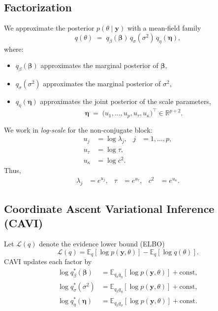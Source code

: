 \documentclass[11pt]{article}
\newcommand{\vect}[1]{\boldsymbol{#1}}
\newcommand{\E}{\mathbb{E}}
\newcommand{\R}{\mathbb{R}}
\begin{document}
\subsection{Factorization}

We approximate the posterior $p(\theta \mid \vect{y})$ with a mean-field family
\begin{equation}
  q(\theta)
  \;=\;
  q_{\beta}(\vect{\beta})\, q_{\sigma}(\sigma^2)\, q_{\eta}(\vect{\eta}),
\end{equation}
where:
\begin{itemize}
  \item $q_\beta(\vect{\beta})$ approximates the marginal posterior of $\vect{\beta}$,
  \item $q_\sigma(\sigma^2)$ approximates the marginal posterior of $\sigma^2$,
  \item $q_\eta(\vect{\eta})$ approximates the joint posterior of the scale parameters,
\[
  \vect{\eta} \;=\; 
  \big(u_1,\dots,u_p,u_\tau,u_\kappa\big)^\top \in \R^{p+2}.
\]
\end{itemize}

We work in \emph{log-scale} for the non-conjugate block:
\begin{align}
  u_j &= \log \lambda_j,      & j &= 1,\dots,p, \\
  u_\tau &= \log \tau, \\
  u_\kappa &= \log c^2.
\end{align}
Thus,
\begin{align}
  \lambda_j &= e^{u_j},
  & \tau &= e^{u_\tau}, 
  & c^2 &= e^{u_\kappa}.
\end{align}

\subsection{Coordinate Ascent Variational Inference (CAVI)}

Let $\mathcal{L}(q)$ denote the evidence lower bound (ELBO)
\[
  \mathcal{L}(q) = \E_q[\log p(\vect{y},\theta)] - \E_q[\log q(\theta)].
\]
CAVI updates each factor by
\begin{align}
  \log q_\beta^*(\vect{\beta})
  &= \E_{q_\sigma q_\eta}[\log p(\vect{y},\theta)] + \text{const}, \\
  \log q_\sigma^*(\sigma^2)
  &= \E_{q_\beta q_\eta}[\log p(\vect{y},\theta)] + \text{const}, \\
  \log q_\eta^*(\vect{\eta})
  &= \E_{q_\beta q_\sigma}[\log p(\vect{y},\theta)] + \text{const}.
\end{align}
\end{document}
